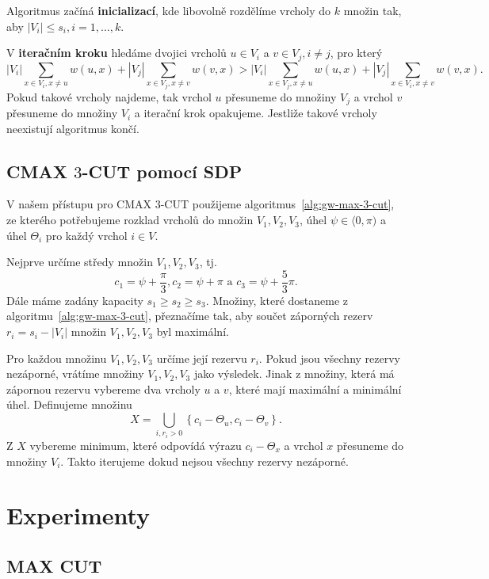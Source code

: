 Algoritmus začíná \textbf{inicializací}, kde libovolně rozdělíme vrcholy do $k$ množin tak, aby $|V_i| \leq s_i, i = 1, \dots, k$.

V \textbf{iteračním kroku} hledáme dvojici vrcholů $u \in V_i$ a $v \in V_j, i \neq j$, pro který
$$
    |V_i| \sum_{x \in V_i, x \neq u} w(u,x) + |V_j| \sum_{x \in V_j, x \neq v} w(v,x) > 
    |V_i| \sum_{x \in V_j, x \neq u} w(u,x) + |V_j| \sum_{x \in V_i, x \neq v} w(v,x).
$$
Pokud takové vrcholy najdeme, tak vrchol $u$ přesuneme do množiny $V_j$ a vrchol $v$ přesuneme do množiny $V_i$ a iterační krok opakujeme. Jestliže takové vrcholy neexistují algoritmus končí.

\subsection{CMAX $3$-CUT pomocí SDP}

V našem přístupu pro CMAX $3$-CUT použijeme algoritmus~\ref{alg:gw-max-3-cut}, ze kterého potřebujeme rozklad vrcholů do množin $V_1, V_2, V_3$, úhel $\psi \in \langle 0, \pi )$ a úhel $\Theta_i$ pro každý vrchol $i \in V$.

Nejprve určíme středy množin $V_1, V_2, V_3$, tj.
$$
    c_1 = \psi + \frac{\pi}{3}, c_2 = \psi + \pi \text{ a } c_3 = \psi + \frac{5}{3} \pi.
$$
Dále máme zadány kapacity $s_1 \geq s_2 \geq s_3$. Množiny, které dostaneme z algoritmu~\ref{alg:gw-max-3-cut}, přeznačíme tak, aby součet záporných rezerv $r_i = s_i - |V_i|$ množin $V_1, V_2, V_3$ byl maximální.

Pro každou množinu $V_1, V_2, V_3$ určíme její rezervu $r_i$. Pokud jsou všechny rezervy nezáporné, vrátíme množiny $V_1, V_2, V_3$ jako výsledek. Jinak z množiny, která má zápornou rezervu vybereme dva vrcholy $u$ a $v$, které mají maximální a minimální úhel. Definujeme množinu
$$
    X = \bigcup_{i, r_i > 0} \left\{ c_i - \Theta_u, c_i - \Theta_v \right\}.
$$
Z $X$ vybereme minimum, které odpovídá výrazu $c_i - \Theta_x$ a vrchol $x$ přesuneme do množiny $V_i$. Takto iterujeme dokud nejsou všechny rezervy nezáporné.


\section{Experimenty}

\subsection{MAX CUT}

